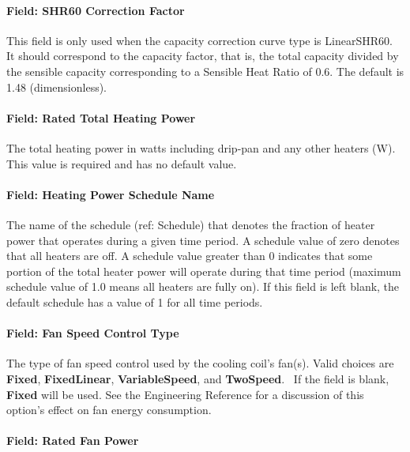 \paragraph{Field: SHR60 Correction Factor}\label{field-shr60-correction-factor}

This field is only used when the capacity correction curve type is LinearSHR60. It should correspond to the capacity factor, that is, the total capacity divided by the sensible capacity corresponding to a Sensible Heat Ratio of 0.6. The default is 1.48 (dimensionless).

\paragraph{Field: Rated Total Heating Power}\label{field-rated-total-heating-power-1}

The total heating power in watts including drip-pan and any other heaters (W). This value is required and has no default value.

\paragraph{Field: Heating Power Schedule Name}\label{field-heating-power-schedule-name-1}

The name of the schedule (ref: Schedule) that denotes the fraction of heater power that operates during a given time period. A schedule value of zero denotes that all heaters are off. A schedule value greater than 0 indicates that some portion of the total heater power will operate during that time period (maximum schedule value of 1.0 means all heaters are fully on). If this field is left blank, the default schedule has a value of 1 for all time periods.

\paragraph{Field: Fan Speed Control Type}\label{field-fan-speed-control-type-1}

The type of fan speed control used by the cooling coil's fan(s). Valid choices are \textbf{Fixed}, \textbf{FixedLinear}, \textbf{VariableSpeed}, and \textbf{TwoSpeed}.~ If the field is blank, \textbf{Fixed} will be used. See the Engineering Reference for a discussion of this option's effect on fan energy consumption.

\paragraph{Field: Rated Fan Power}\label{field-rated-fan-power-3}

